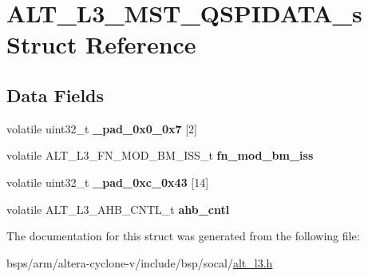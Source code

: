 \hypertarget{structALT__L3__MST__QSPIDATA__s}{}\section{A\+L\+T\+\_\+\+L3\+\_\+\+M\+S\+T\+\_\+\+Q\+S\+P\+I\+D\+A\+T\+A\+\_\+s Struct Reference}
\label{structALT__L3__MST__QSPIDATA__s}
\subsection*{Data Fields}
\begin{DoxyCompactItemize}
\item 
\mbox{\label{structALT__L3__MST__QSPIDATA__s_a46bbceb00b47c1dc1ded30e499cbe51b}} 
volatile uint32\+\_\+t {\bfseries \+\_\+pad\+\_\+0x0\+\_\+0x7} \mbox{[}2\mbox{]}
\item 
\mbox{\label{structALT__L3__MST__QSPIDATA__s_af8b7c84d26d09dd78de6773dbfd05eba}} 
volatile A\+L\+T\+\_\+\+L3\+\_\+\+F\+N\+\_\+\+M\+O\+D\+\_\+\+B\+M\+\_\+\+I\+S\+S\+\_\+t {\bfseries fn\+\_\+mod\+\_\+bm\+\_\+iss}
\item 
\mbox{\label{structALT__L3__MST__QSPIDATA__s_af8281bcda43f9b1c462b71034efe0ae1}} 
volatile uint32\+\_\+t {\bfseries \+\_\+pad\+\_\+0xc\+\_\+0x43} \mbox{[}14\mbox{]}
\item 
\mbox{\label{structALT__L3__MST__QSPIDATA__s_a9d2cbd7a335e7423324138e208826fab}} 
volatile A\+L\+T\+\_\+\+L3\+\_\+\+A\+H\+B\+\_\+\+C\+N\+T\+L\+\_\+t {\bfseries ahb\+\_\+cntl}
\end{DoxyCompactItemize}


The documentation for this struct was generated from the following file\+:\begin{DoxyCompactItemize}
\item 
bsps/arm/altera-\/cyclone-\/v/include/bsp/socal/\mbox{\hyperlink{alt__l3_8h}{alt\+\_\+l3.\+h}}\end{DoxyCompactItemize}
